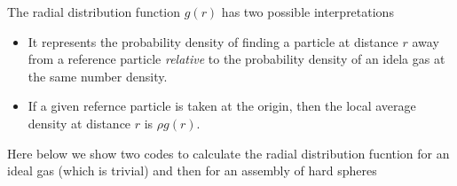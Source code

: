 \documentclass[
  letterpaper,
  enabledeprecatedfontcommands]{report}
\providecommand{\tightlist}{%
  \setlength{\itemsep}{0pt}\setlength{\parskip}{0pt}}
\begin{document}
\begin{tcolorbox}[enhanced jigsaw, breakable, colframe=quarto-callout-important-color-frame, colback=white, arc=.35mm, left=2mm, leftrule=.75mm, bottomrule=.15mm, rightrule=.15mm, toprule=.15mm, opacityback=0]
\begin{minipage}[t]{5.5mm}
\textcolor{quarto-callout-important-color}{\faExclamation}
\end{minipage}%
\begin{minipage}[t]{\textwidth - 5.5mm}

The radial distribution function \(g(r)\) has two possible
interpretations

\begin{itemize}
\tightlist
\item
  It represents the probability density of finding a particle at
  distance \(r\) away from a reference particle \emph{relative} to the
  probability density of an idela gas at the same number density.
\item
  If a given refernce particle is taken at the origin, then the local
  average density at distance \(r\) is \(\rho g(r)\).
\end{itemize}

\end{minipage}%
\end{tcolorbox}

Here below we show two codes to calculate the radial distribution
fucntion for an ideal gas (which is trivial) and then for an assembly of
hard spheres
\end{document}
